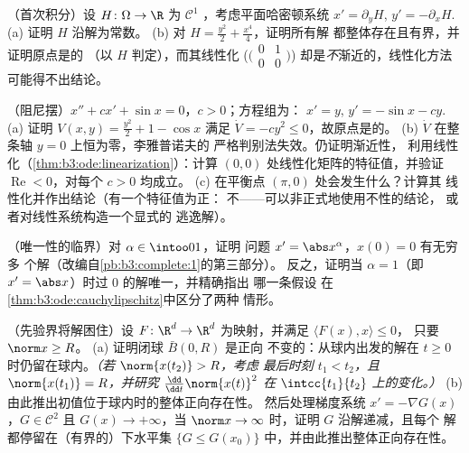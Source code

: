 \begin{exercise}[$\star\star$]\label{exo:b3:ode:7}
（首次积分）设 $H \colon \Omega \to \R$ 为 $\mathcal
C^1$ ，考虑平面哈密顿系统 $x' =
\partial_yH$, $y' = -\partial_xH$.
(a) 证明 $H$ 沿解为常数。
(b) 对 $H = \frac{y^2}2 + \frac{x^4}4$，证明所有解
都整体存在且有界，并证明原点是的
（以 $H$ 判定），而其线性化
($\bigl(\begin{smallmatrix}0&1\\0&0\end{smallmatrix}\bigr)$)
却是\emph{不}渐近的，线性化方法
可能得不出结论。
\end{exercise}

\begin{exercise}[$\star\star\star$]\label{exo:b3:ode:8}
（阻尼摆）$x'' + cx' + \sin x = 0$，$c > 0$；方程组为：
$x' = y$, $y' = -\sin x - cy$.
(a) 证明 $V(x, y) = \frac{y^2}2 + 1 - \cos x$ 满足 $\dot
V = -cy^2 \leq 0$，故原点是的。
(b) $\dot V$ 在整条轴 $y = 0$ 上恒为零，李雅普诺夫的
严格判别法失效。仍证明渐近性，
利用线性化（\cref{thm:b3:ode:linearization}）：计算
$(0,0)$ 处线性化矩阵的特征值，并验证
$\operatorname{Re} < 0$，对每个 $c > 0$ 均成立。
(c) 在平衡点 $(\pi, 0)$ 处会发生什么？计算其
线性化并作出结论（有一个特征值为正：
不——可以非正式地使用不性的结论，
或者对线性系统构造一个显式的
逃逸解）。
\end{exercise}

\begin{exercise}[$\star\star$]\label{exo:b3:ode:9}
（唯一性的临界）对 $\alpha \in \intoo01$，证明
问题 $x' = \abs x^{\alpha}$，$x(0) = 0$ 有无穷多
个解（改编自\cref{pb:b3:complete:1}的第三部分）。
反之，证明当 $\alpha = 1$（即 $x' = \abs
x$）时过 $0$ 的解唯一，并精确指出
哪一条假设
在\cref{thm:b3:ode:cauchylipschitz}中区分了两种
情形。
\end{exercise}

\begin{exercise}[$\star\star\star$]\label{exo:b3:ode:10}
（先验界将解困住）设 $F \colon \R^d \to \R^d$
为映射，并满足 $\langle F(x), x\rangle \leq 0$，
只要 $\norm x \geq R$。
(a) 证明闭球 $\bar B(0, R)$ 是正向
不变的：从球内出发的解在 $t \geq
0$ 时仍留在球内。\emph{（若 $\norm{x(t_2)} > R$，考虑
最后时刻 $t_1 < t_2$，且 $\norm{x(t_1)} = R$，并研究
$\frac{\dd}{\dd t}\norm{x(t)}^2$ 在 $\intcc{t_1}{t_2}$ 上的变化。）}
(b) 由此推出初值位于球内时的整体正向存在性。
然后处理梯度系统 $x' = -\nabla G(x)$，$G \in
\mathcal C^2$ 且 $G(x) \to +\infty$，当 $\norm x \to
\infty$ 时，证明 $G$ 沿解递减，且每个
解都停留在（有界的）下水平集 $\{G \leq
G(x_0)\}$ 中，并由此推出整体正向存在性。
\end{exercise}

